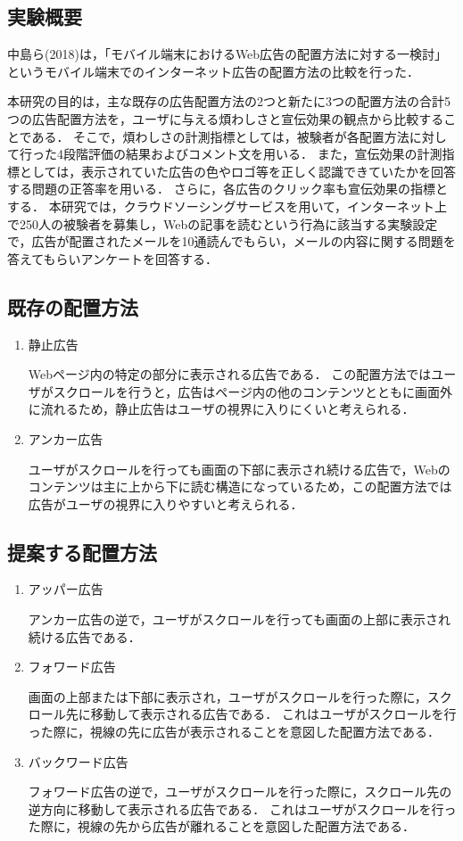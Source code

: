 \documentclass[12pt,a4j,titlepage]{ltjsarticle}
\begin{document}
\subsection{実験概要}
中島ら(2018)は，「モバイル端末におけるWeb広告の配置方法に対する一検討」というモバイル端末でのインターネット広告の配置方法の比較を行った\cite{mobile}．

本研究の目的は，主な既存の広告配置方法の2つと新たに3つの配置方法の合計5つの広告配置方法を，ユーザに与える煩わしさと宣伝効果の観点から比較することである．
そこで，煩わしさの計測指標としては，被験者が各配置方法に対して行った4段階評価の結果およびコメント文を用いる．
また，宣伝効果の計測指標としては，表示されていた広告の色やロゴ等を正しく認識できていたかを回答する問題の正答率を用いる．
さらに，各広告のクリック率も宣伝効果の指標とする．
本研究では，クラウドソーシングサービスを用いて，インターネット上で250人の被験者を募集し，Webの記事を読むという行為に該当する実験設定で，広告が配置されたメールを10通読んでもらい，メールの内容に関する問題を答えてもらいアンケートを回答する．

\subsection{既存の配置方法}
\begin{enumerate}
\item 静止広告

Webページ内の特定の部分に表示される広告である．
この配置方法ではユーザがスクロールを行うと，広告はページ内の他のコンテンツとともに画面外に流れるため，静止広告はユーザの視界に入りにくいと考えられる．
\item アンカー広告

ユーザがスクロールを行っても画面の下部に表示され続ける広告で，Webのコンテンツは主に上から下に読む構造になっているため，この配置方法では広告がユーザの視界に入りやすいと考えられる．
\end{enumerate}

\subsection{提案する配置方法}
\begin{enumerate}[i]
\item アッパー広告

アンカー広告の逆で，ユーザがスクロールを行っても画面の上部に表示され続ける広告である．
\item フォワード広告

画面の上部または下部に表示され，ユーザがスクロールを行った際に，スクロール先に移動して表示される広告である．
これはユーザがスクロールを行った際に，視線の先に広告が表示されることを意図した配置方法である．

\item バックワード広告

フォワード広告の逆で，ユーザがスクロールを行った際に，スクロール先の逆方向に移動して表示される広告である．
これはユーザがスクロールを行った際に，視線の先から広告が離れることを意図した配置方法である．
\end{enumerate}
\end{document}
